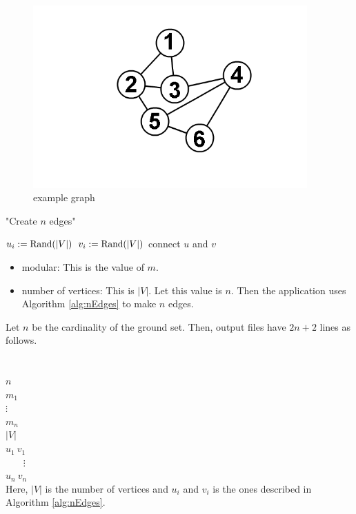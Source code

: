 \documentclass{article}
\newcommand{\modular}{modular: This is the value of $m$.
}
\newcommand{\out}[1]{
Let $n$ be the cardinality of the ground set.
Then, output files have $#1$ lines as follows.\\ \mbox{}\\
}
\begin{document}
\begin{figure}[h!]\label{garMatPic}
{
\fontsize{10pt}{12pt}\selectfont
\centering
\includegraphics[height=7.0cm]{picture/graph.png}
\caption{example graph }
}
\end{figure}

\begin{algorithm}[h!]
\fontsize{10pt}{12.0pt}\selectfont
   \caption{"Create $n$ edges"}
   \label{alg:nEdges}
\begin{algorithmic}
   \STATE $u_i:= {\rm Rand}(|V|)$
   \STATE $v_i:= {\rm Rand}(|V|)$
   \STATE connect $u$ and $v$
   \ENDFOR
\end{algorithmic}
\end{algorithm}

\begin{itemize}
\item \modular
\item number of vertices:
This is $|V|$.
Let this value is $n$.
Then the application uses Algorithm \ref{alg:nEdges} to make $n$ edges.

\end{itemize}

\out{2n+2}\\
$n$\\
$m_1$ \\
$\vdots$ \\
$m_n$ \\
$|V|$ \\
$u_1~v_1$\\
\mbox{}~~~ $\vdots$\\
$u_n~v_n$\\

Here, $|V|$ is the number of vertices
and $u_i$ and $v_i$ is the ones described in Algorithm \ref{alg:nEdges}.
\end{document}
